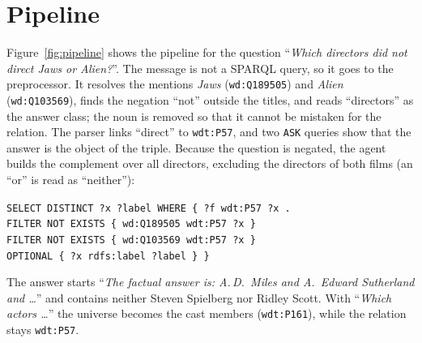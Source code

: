 \documentclass{article}
\begin{document}
\section{Pipeline}

Figure~\ref{fig:pipeline} shows the pipeline for the question ``\textit{Which directors did not direct Jaws or Alien?}''. The message is not a SPARQL query, so it goes to the preprocessor. It resolves the mentions \textit{Jaws} (\texttt{wd:Q189505}) and \textit{Alien} (\texttt{wd:Q103569}), finds the negation ``not'' outside the titles, and reads ``directors'' as the answer class; the noun is removed so that it cannot be mistaken for the relation. The parser links ``direct'' to \texttt{wdt:P57}, and two \texttt{ASK} queries show that the answer is the object of the triple. Because the question is negated, the agent builds the complement over all directors, excluding the directors of both films (an ``or'' is read as ``neither''):
\begin{center}
\texttt{SELECT DISTINCT ?x ?label WHERE \{ ?f wdt:P57 ?x .}\\
\texttt{FILTER NOT EXISTS \{ wd:Q189505 wdt:P57 ?x \}}\\
\texttt{FILTER NOT EXISTS \{ wd:Q103569 wdt:P57 ?x \}}\\
\texttt{OPTIONAL \{ ?x rdfs:label ?label \} \}}
\end{center}
The answer starts ``\textit{The factual answer is: A.\,D.\ Miles and A.\ Edward Sutherland and \dots}'' and contains neither Steven Spielberg nor Ridley Scott. With ``\textit{Which actors \dots}'' the universe becomes the cast members (\texttt{wdt:P161}), while the relation stays \texttt{wdt:P57}.
\end{document}
